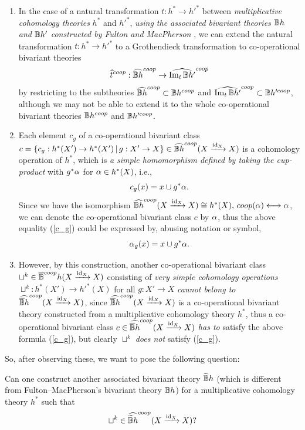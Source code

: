 \documentclass[a4paper]{amsart}
\begin{document}
\begin{enumerate}
\item In the case of a natural transformation $t:h^* \to h'^*$ between \emph{multiplicative cohomology theories} $h^*$ and $h'^*$, \emph{using the associated bivariant theories $\mathbb B h$ and $\mathbb B h'$ constructed by Fulton and MacPherson} \cite[\S 3.1 Construction of a bivariant theory from a cohomology theory]{FM}, we can extend the natural transformation $t:h^* \to h'^*$ to a Grothendieck transformation to co-operational bivariant theories
$$\widehat t^{coop}: \widehat{\mathbb B h}^{coop} \to \widehat{\operatorname{Im}_t \mathbb B h'}^{coop}$$ 
by restricting to the subtheories $\widehat{\mathbb B h}^{coop} \subset \mathbb B h^{coop}$ and $\widehat{\operatorname{Im}_t \mathbb B h'}^{coop} \subset \mathbb B h'^{coop}$, although we may not be able to extend it to the whole co-operational bivariant theories $\mathbb B h^{coop}$ and $\mathbb B h'^{coop}$.
\item Each element $c_g$ of a co-operational bivariant class $c =\{c_g :h^*(X') \to h^*(X') \, | \, g:X' \to X\}\in \widehat{\mathbb B h}^{coop}(X \xrightarrow {\operatorname{id}_X} X)$ 
is a cohomology operation of $h^*$, which is \emph{a simple homomorphism defined by taking the cup-product} with $g^*\alpha$ for $\alpha \in h^*(X)$, i.e.,
\begin{equation}\label{c_g}
c_g(x) = x \cup g^*\alpha.
\end{equation}
Since we have the isomorphism $\widehat{\mathbb B h}^{coop}(X \xrightarrow {\operatorname{id}_X} X) \cong h^*(X),\, coop(\alpha) \longleftrightarrow \alpha$, we can denote the co-operational bivariant class $c$ by $\alpha$, thus the above equality (\ref{c_g}) could be expressed by, abusing notation or symbol,
\begin{equation*}
\alpha_g(x) = x \cup g^*\alpha.
\end{equation*}
\item However, by this construction, another co-operational bivariant class $\sqcup^k \in \overline{\mathbb B}^{coop}h(X \xrightarrow {\operatorname{id}_X} X)$ consisting of \emph{very simple cohomology operations} $\sqcup^k:h^*(X') \to h'^*(X)$ for all $g:X' \to X$ \emph{cannot belong to} $\widehat{\overline{\mathbb B} h}^{coop}(X \xrightarrow {\operatorname{id}_X} X)$, since $\widehat{\overline{\mathbb B} h}^{coop}(X \xrightarrow {\operatorname{id}_X} X)$ is a co-operational bivariant theory constructed from a multiplicative cohomology theory $h^*$, thus a co-operational bivariant class $c \in \widehat{\overline{\mathbb B} h}^{coop}(X \xrightarrow {\operatorname{id}_X} X)$ \emph{has to} satisfy the above formula (\ref{c_g}), but clearly $\sqcup^k$ \emph{does not} satisfy (\ref{c_g}).
\end{enumerate}
So, after observing these, we want to pose the following question:
\begin{qu} Can one construct another associated bivariant theory $\widetilde {\mathbb B} h$ (which is different from Fulton--MacPherson's bivariant theory $\mathbb B h$) for a multiplicative cohomology theory $h^*$ such that 
$$\sqcup^k \in \widehat{\widetilde {\mathbb B} h}^{coop}(X \xrightarrow {\operatorname{id}_X} X)?$$
\end{qu}
\end{document}
